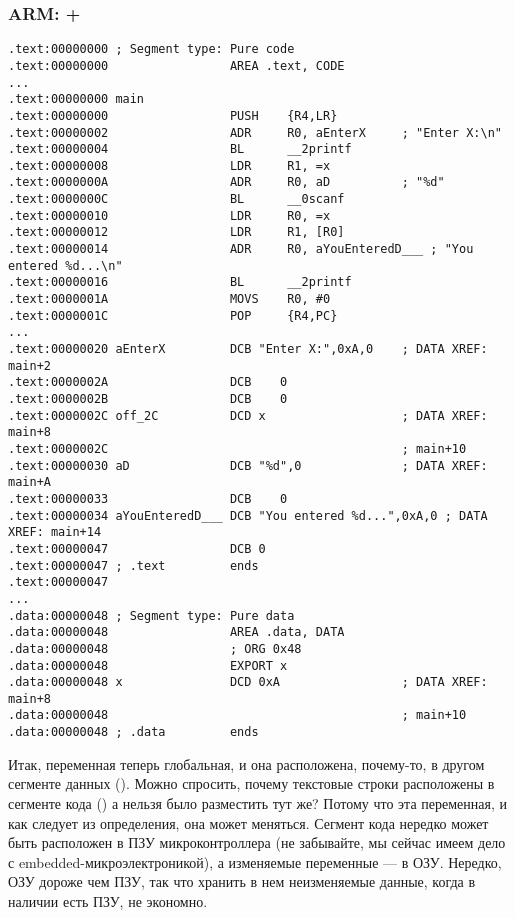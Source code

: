 ﻿\subsubsection{ARM: \OptimizingKeil + \ThumbMode}

\begin{lstlisting}
.text:00000000 ; Segment type: Pure code
.text:00000000                 AREA .text, CODE
...
.text:00000000 main
.text:00000000                 PUSH    {R4,LR}
.text:00000002                 ADR     R0, aEnterX     ; "Enter X:\n"
.text:00000004                 BL      __2printf
.text:00000008                 LDR     R1, =x
.text:0000000A                 ADR     R0, aD          ; "%d"
.text:0000000C                 BL      __0scanf
.text:00000010                 LDR     R0, =x
.text:00000012                 LDR     R1, [R0]
.text:00000014                 ADR     R0, aYouEnteredD___ ; "You entered %d...\n"
.text:00000016                 BL      __2printf
.text:0000001A                 MOVS    R0, #0
.text:0000001C                 POP     {R4,PC}
...
.text:00000020 aEnterX         DCB "Enter X:",0xA,0    ; DATA XREF: main+2
.text:0000002A                 DCB    0
.text:0000002B                 DCB    0
.text:0000002C off_2C          DCD x                   ; DATA XREF: main+8
.text:0000002C                                         ; main+10
.text:00000030 aD              DCB "%d",0              ; DATA XREF: main+A
.text:00000033                 DCB    0
.text:00000034 aYouEnteredD___ DCB "You entered %d...",0xA,0 ; DATA XREF: main+14
.text:00000047                 DCB 0
.text:00000047 ; .text         ends
.text:00000047
...
.data:00000048 ; Segment type: Pure data
.data:00000048                 AREA .data, DATA
.data:00000048                 ; ORG 0x48
.data:00000048                 EXPORT x
.data:00000048 x               DCD 0xA                 ; DATA XREF: main+8
.data:00000048                                         ; main+10
.data:00000048 ; .data         ends
\end{lstlisting}

Итак, переменная  теперь глобальная, и она расположена, почему-то, в другом сегменте данных (). 
Можно спросить, почему текстовые строки расположены в сегменте кода () а  нельзя было разместить
тут же? Потому что эта переменная, и как следует из определения, она может меняться. Сегмент кода нередко может 
быть расположен в ПЗУ микроконтроллера (не забывайте, мы сейчас имеем дело с embedded-микроэлектроникой),
а изменяемые переменные --- в ОЗУ.
Нередко, ОЗУ дороже чем ПЗУ, так что хранить в нем неизменяемые данные, когда в наличии есть ПЗУ, не экономно.

